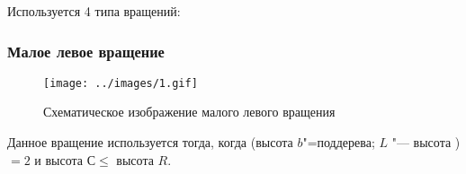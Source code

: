 \begin{frame}
    Используется 4 типа вращений:

    \frametitle{Малое левое вращение}

    \begin{figure}[ht]
        \texttt{[image: ../images/1.gif]}
        
        \caption{Схематическое изображение малого левого вращения}    
    \end{figure}

    Данное вращение используется тогда,
    когда (высота $b$"=поддерева; $L$ "--- высота )
    $= 2$ и высота $С \leqslant$ высота $R$.

\end{frame}